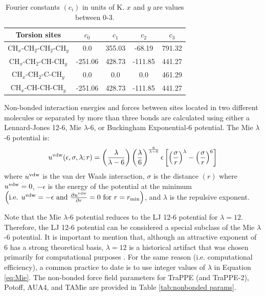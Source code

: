 \documentclass[journal=jctc,manuscript=article]{achemso}
\begin{document}
\begin{table}[h!]
	\caption{Fourier constants $(c_i)$ in units of K. $x$ and $y$ are values between 0-3.} \label{tab:torsions}
	\begin{center}
		\begin{tabular}{|c|c|c|c|c|}
			\hline
			Torsion sites & $c_0$ & $c_1$ & $c_2$ & $c_3$ \\ \hline
			CH$_x$-CH$_2$-CH$_2$-CH$_y$ & 0.0 & 355.03 & -68.19 & 791.32 \\ 
            CH$_x$-CH$_2$-CH-CH$_y$ & -251.06 & 428.73 & -111.85 & 441.27 \\
            CH$_x$-CH$_2$-C-CH$_y$ & 0.0 & 0.0 & 0.0 & 461.29 \\
            CH$_x$-CH-CH-CH$_y$ & -251.06 & 428.73 & -111.85 & 441.27 \\
			\hline
		\end{tabular}
	\end{center} 
\end{table}
Non-bonded interaction energies and forces between sites located in two different molecules or separated by more than three bonds are calculated using either a Lennard-Jones 12-6, Mie $\lambda$-6, or Buckingham Exponential-6 potential. The Mie $\lambda$-6 potential is:
\begin{equation} \label{eq:Mie}
u^{\rm vdw}(\epsilon,\sigma,\lambda;r) = \left(\frac{\lambda}{\lambda - 6}\right)\left(\frac{\lambda}{6}\right)^{\frac{6}{\lambda - 6}} \epsilon \left[\left(\frac{\sigma}{r}\right)^\lambda - \left(\frac{\sigma}{r}\right)^6\right]
\end{equation} 
where $u^{\rm vdw}$ is the van der Waals interaction, $\sigma$ is the distance $(r)$ where $u^{\rm vdw} = 0$, $-\epsilon$ is the energy of the potential at the minimum $\left(\text{i.e. }u^{\rm vdw} = -\epsilon \text{ and } \frac{\partial u^{\rm vdw}}{\partial r} = 0 \text{ for } r=r_{\rm min} \right)$, and $\lambda$ is the repulsive exponent. 

Note that the Mie $\lambda$-6 potential reduces to the LJ 12-6 potential for $\lambda = 12$. Therefore, the LJ 12-6 potential can be considered a special subclass of the Mie $\lambda$-6 potential. It is important to mention that, although an attractive exponent of 6 has a strong theoretical basis, $\lambda = 12$ is a historical artifact that was chosen primarily for computational purposes \cite{Allen1987}. For the same reason (i.e. computational efficiency), a common practice to date is to use integer values of $\lambda$ in Equation \ref{eq:Mie}. The non-bonded force field parameters for TraPPE (and TraPPE-2), Potoff, AUA4, and TAMie are provided in Table \ref{tab:nonbonded params}.
\end{document}
